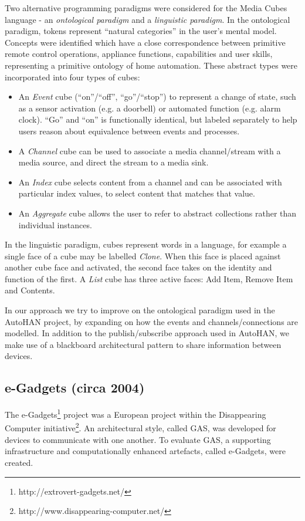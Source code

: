 Two alternative programming paradigms were considered for the Media Cubes language - an \emph{ontological paradigm} and a \emph{linguistic paradigm}. In the ontological paradigm, tokens represent ``natural categories'' in the user's mental model. Concepts were identified which have a close correspondence between primitive remote control operations, appliance functions, capabilities and user skills, representing a primitive ontology of home automation. These abstract types were incorporated into four types of  cubes:

\begin{itemize}
	\item An \emph{Event} cube (``on''/``off'', ``go''/``stop'') to represent a change of state, such as a sensor activation (e.g. a doorbell) or automated function (e.g. alarm clock). ``Go'' and ``on'' is functionally identical, but labeled separately to help users reason about equivalence between events and processes.
	\item A \emph{Channel} cube can be used to associate a media channel/stream with a media source, and direct the stream to a media sink.
	\item An \emph{Index} cube selects content from a channel and can be associated with particular index values, to select content that matches that value. 
	\item An \emph{Aggregate} cube allows the user to refer to abstract collections rather than individual instances.
\end{itemize}

In the linguistic paradigm, cubes represent words in a language, for example a single face of a cube may be labelled \emph{Clone}. When this face is placed against another cube face and activated, the second face takes on the identity and function of the first. A \emph{List} cube has three active faces: Add Item, Remove Item and Contents.

In our approach we try to improve on the ontological par\-a\-digm used in the AutoHAN project, by expanding on how the events and channels/connections are modelled. In addition to the publish/subscribe approach used in AutoHAN, we make use of a blackboard architectural pattern to share information between devices. 


\subsection{e-Gadgets (circa 2004)}
\label{egadgets}

The e-Gadgets\footnote{http://extrovert-gadgets.net/} project was a European project within the Disappearing Computer initiative\footnote{http://www.disappearing-computer.net/}. An architectural style, called \ac{GAS}, was developed for devices to communicate with one another. To evaluate \ac{GAS}, a supporting infrastructure and computationally enhanced artefacts, called e-Gadgets, were created.


